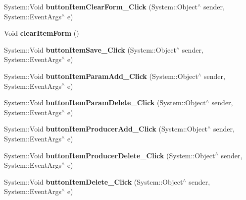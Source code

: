 \begin{DoxyCompactItemize}
\item 
\hypertarget{class_magazyn_1_1_magazin_a43c3506c415fae23e2026ee1668d6284}{}\label{class_magazyn_1_1_magazin_a43c3506c415fae23e2026ee1668d6284} 
System\+::\+Void {\bfseries button\+Item\+Clear\+Form\+\_\+\+Click} (System\+::\+Object$^\wedge$ sender, System\+::\+Event\+Args$^\wedge$ e)
\item 
\hypertarget{class_magazyn_1_1_magazin_ae8eaea84ec62af014904e6ea941d418f}{}\label{class_magazyn_1_1_magazin_ae8eaea84ec62af014904e6ea941d418f} 
Void {\bfseries clear\+Item\+Form} ()
\item 
\hypertarget{class_magazyn_1_1_magazin_a3cc415a7ff1f948ad064058868303f0f}{}\label{class_magazyn_1_1_magazin_a3cc415a7ff1f948ad064058868303f0f} 
System\+::\+Void {\bfseries button\+Item\+Save\+\_\+\+Click} (System\+::\+Object$^\wedge$ sender, System\+::\+Event\+Args$^\wedge$ e)
\item 
\hypertarget{class_magazyn_1_1_magazin_a7cb15f12b46223355e42333f67c5b6ff}{}\label{class_magazyn_1_1_magazin_a7cb15f12b46223355e42333f67c5b6ff} 
System\+::\+Void {\bfseries button\+Item\+Param\+Add\+\_\+\+Click} (System\+::\+Object$^\wedge$ sender, System\+::\+Event\+Args$^\wedge$ e)
\item 
\hypertarget{class_magazyn_1_1_magazin_a112455c9a1b5f08b85544abf2cbfb906}{}\label{class_magazyn_1_1_magazin_a112455c9a1b5f08b85544abf2cbfb906} 
System\+::\+Void {\bfseries button\+Item\+Param\+Delete\+\_\+\+Click} (System\+::\+Object$^\wedge$ sender, System\+::\+Event\+Args$^\wedge$ e)
\item 
\hypertarget{class_magazyn_1_1_magazin_a633c56775a43b9b7e8b5be63f7814e08}{}\label{class_magazyn_1_1_magazin_a633c56775a43b9b7e8b5be63f7814e08} 
System\+::\+Void {\bfseries button\+Item\+Producer\+Add\+\_\+\+Click} (System\+::\+Object$^\wedge$ sender, System\+::\+Event\+Args$^\wedge$ e)
\item 
\hypertarget{class_magazyn_1_1_magazin_a811b8f04e245301b0da541c8d6bd73a9}{}\label{class_magazyn_1_1_magazin_a811b8f04e245301b0da541c8d6bd73a9} 
System\+::\+Void {\bfseries button\+Item\+Producer\+Delete\+\_\+\+Click} (System\+::\+Object$^\wedge$ sender, System\+::\+Event\+Args$^\wedge$ e)
\item 
\hypertarget{class_magazyn_1_1_magazin_ab61f7ce6732b6fd67e6b0871087ce5df}{}\label{class_magazyn_1_1_magazin_ab61f7ce6732b6fd67e6b0871087ce5df} 
System\+::\+Void {\bfseries button\+Item\+Delete\+\_\+\+Click} (System\+::\+Object$^\wedge$ sender, System\+::\+Event\+Args$^\wedge$ e)
\item 
\hypertarget{class_magazyn_1_1_magazin_a142c4fbd25886c879895c7c5df898643}{}\label{class_magazyn_1_1_magazin_a142c4fbd25886c879895c7c5df898643} 

\end{DoxyCompactItemize}
